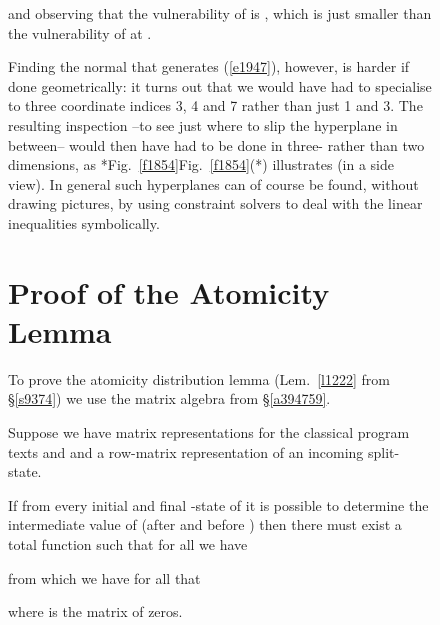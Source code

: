 \documentclass[runningheads]{llncs}
\newcommand\Sec[1] {Sec.~\ref{#1}}
\newcommand\App[1] {App.~\ref{#1}}
\renewcommand\Sec[1] {\S\ref{#1}}
\renewcommand\App[1] {\S\ref{#1}}
\newcommand\Eqn[1] {(\ref{#1})}
\newenvironment{Figure}[2][t]{\begin{figure}[#1]\def\Label{#2}\small}{\label{\Label}\end{figure}}
\newcommand\Lem[1] {Lem.~\ref{#1}}
\newcommand\Fig[2][*] {{\def\z{#1}\if*\z Fig.~\ref{#2}\else Fig.~\ref{#2}(#1)\fi}}
\begin{document}
\begin{Figure}[ht!]{f1228}
{and observing that the vulnerability of 
 is , which is just smaller than the vulnerability of  at . 
} 

Finding the normal that generates \Eqn{e1947}, however, is harder if done geometrically: it turns out that we would have had to specialise to three coordinate indices 3, 4 and 7 rather than just 1 and 3. 
The resulting inspection --to see just where to slip the hyperplane in between-- would then have had to be done in three- rather than two dimensions, as \Fig{f1854} illustrates (in a side view). In general such hyperplanes can of course be found, without drawing pictures, by using constraint solvers to deal with the linear inequalities symbolically.\par



\section{Proof of the Atomicity Lemma} \label{a29375}

To prove the atomicity distribution lemma (\Lem{l1222} from \Sec{s9374}) we use the matrix algebra from \App{a394759}.

Suppose we have matrix representations  for the classical program texts  and  and a row-matrix representation  of an incoming split-state.

If from every initial and final -state of  it is possible to determine the intermediate value of  (after  and before ) then there must exist a total function  such that for all  we have

from which we have for all  that

where  is the  matrix of zeros.


\end{Figure}
\end{document}
